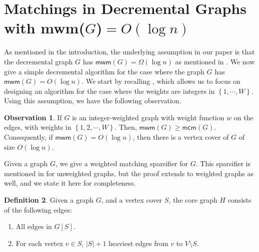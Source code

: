 \documentclass[a4paper,11pt]{article}
\newcommand{\set}[1]{\ensuremath{\left\{ #1 \right\}}}
\theoremstyle{definition}
\newtheorem{definition2}{Definition}
\theoremstyle{definition}
\theoremstyle{definition}
\theoremstyle{definition}
\theoremstyle{definition}
\theoremstyle{definition}
\theoremstyle{definition}
\newtheorem{observation2}[definition2]{Observation}
\theoremstyle{definition}
\theoremstyle{definition}
\theoremstyle{definition}
\theoremstyle{definition}
\theoremstyle{definition}
\theoremstyle{definition}
\theoremstyle{definition}
\theoremstyle{definition}
\begin{document}
\section{Matchings in Decremental Graphs with \textsf{mwm}($G$)$=O(\log n)$}
\label{section:smallmatching}

As mentioned in the introduction, the underlying assumption in our paper is that the decremental graph $G$ has $\textsf{mwm}(G)=\Omega(\log n)$ as mentioned in . We now give a simple decremental algorithm for the case where the graph $G$ has $\textsf{mwm}(G)=O(\log n)$. We start by recalling , which allows us to focus on designing an algorithm for the case where the weights are integers in $\set{1,\cdots, W}$. Using this assumption, we have the following observation.

\begin{observation2}
If $G$ is an integer-weighted graph with weight function $w$ on the edges, with weights in $\set{1,2,\cdots,W}$. Then, $\textsf{mwm}(G)\geqslant \textsf{mcm}(G)$. Consequently, if $\textsf{mwm}(G)=O(\log n)$, then there is a vertex cover of $G$ of size $O(\log n)$. 
\end{observation2}

Given a graph $G$, we give a weighted matching sparsifier for $G$. This sparsifier is mentioned in \cite{GP13} for unweighted graphs, but the proof extends to weighted graphs as well, and we state it here for completeness.

\begin{definition2}
Given a graph $G$, and a vertex cover $S$, the core graph $H$ consists of the following edges:
\begin{enumerate}
\item All edges in $G[S]$.
\item For each vertex $v\in S$, $|S|+1$ heaviest edges from $v$ to $V\setminus S$. 
\end{enumerate}
\end{definition2}
\end{document}

